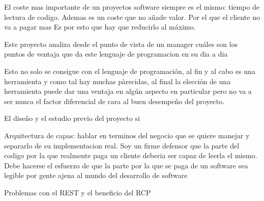 El coste mas importante de un proyectos software siempre es el mismo: tiempo de lectura de codigo. Ademas es un coste que no añade valor. Por el que el cliente no va a pagar mas
Es por esto que hay que reducirlo al máximo.

Este proyecto analiza desde el punto de vista de un manager cuáles son los puntos de ventaja que da este lenguaje de programacion en su dia a dia

Esto no solo se consigue con el lenguaje de programación, al fin y al cabo es una herramienta y como tal hay muchas pàrecidas, al final la elección de una herramienta puede dar una ventaja en algún aspecto en particular pero no va a ser nunca el factor diferencial de cara al buen desempeño del proyecto.

El diseño y el estudio previo del proyecto si

Arquitectura de capas: hablar en terminos del negocio que se quiere manejar y separarlo de su implementacion real. Soy un firme defensor que la parte del codigo por la que realmente paga un cliente deberia ser capaz de leerla el mismo. Debe hacerse el esfuerzo de que la parte por la que se paga de un software sea legible por gente ajena al mundo del desarrollo de software

Problemas con el REST y el beneficio del RCP
